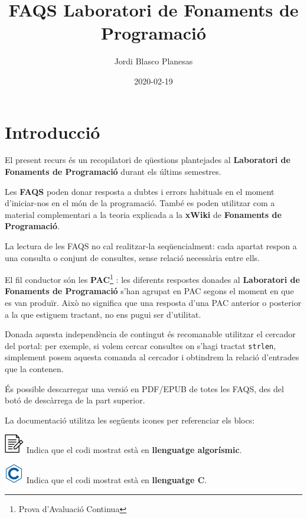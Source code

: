 \documentclass[]{book}
\title{FAQS Laboratori de Fonaments de Programació}
\author{Jordi Blasco Planesas}
\date{2020-02-19}
\let\rmarkdownfootnote\footnote%
\def\footnote{\protect\rmarkdownfootnote}
\begin{document}
\maketitle

{
\setcounter{tocdepth}{1}
\tableofcontents
}
\chapter*{Introducció}\label{introduccio}

El present recurs és un recopilatori de qüestions plantejades al
\textbf{Laboratori de Fonaments de Programació} durant els últims
semestres.

Les \textbf{FAQS} poden donar resposta a dubtes i errors habituals en el
moment d'iniciar-nos en el món de la programació. També es poden
utilitzar com a material complementari a la teoria explicada a la
\textbf{xWiki} de \textbf{Fonaments de Programació}.

La lectura de les FAQS no cal realitzar-la seqüencialment: cada apartat
respon a una consulta o conjunt de consultes, sense relació necessària
entre ells.

El fil conductor són les \textbf{PAC}\footnote{Prova d'Avaluació
  Continua} : les diferents respostes donades al \textbf{Laboratori de
Fonaments de Programació} s'han agrupat en PAC segons el moment en que
es van produïr. Això no significa que una resposta d'una PAC anterior o
posterior a la que estiguem tractant, no ens pugui ser d'utilitat.

Donada aquesta independència de contingut és recomanable utilitzar el
cercador del portal: per exemple, si volem cercar consultes on s'hagi
tractat \texttt{strlen}, simplement posem aquesta comanda al cercador i
obtindrem la relació d'entrades que la contenen.

És possible descarregar una versió en PDF/EPUB de totes les FAQS, des
del botó de descàrrega de la part superior.

La documentació utilitza les següents icones per referenciar els blocs:

\includegraphics{./img/alg.png} Indica que el codi mostrat està en
\textbf{llenguatge algorísmic}.

\includegraphics{./img/c.png} Indica que el codi mostrat està en
\textbf{llenguatge C}.
\end{document}
